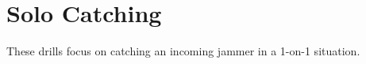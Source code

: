 \section*{Solo Catching}
These drills focus on catching an incoming jammer in a 1-on-1 situation.

\vspace{0.5cm}

